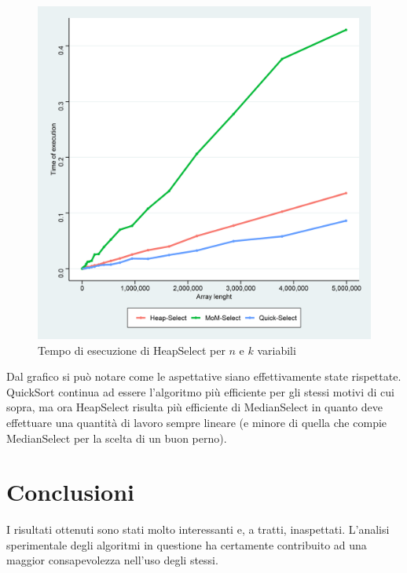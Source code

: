\documentclass{article}
\begin{document}
	\begin{figure}[h!]
  		\includegraphics[width=\linewidth]{images/Grafico_Con_K1.png}
  		\caption{Tempo di esecuzione di HeapSelect per $n$ e $k$ variabili}
  		\label{fig:graph6}
	\end{figure}
	
	Dal grafico si può notare come le aspettative siano effettivamente state rispettate. QuickSort continua ad essere l'algoritmo più efficiente per gli stessi motivi di cui sopra, ma ora HeapSelect risulta più efficiente di MedianSelect in quanto deve effettuare una quantità di lavoro sempre lineare (e minore di quella che compie MedianSelect per la scelta di un buon perno).
	
	
	\newpage

	\section{Conclusioni}
	I risultati ottenuti sono stati molto interessanti e, a tratti, inaspettati. L'analisi sperimentale degli algoritmi in questione ha certamente contribuito ad una maggior consapevolezza nell'uso degli stessi.
\end{document}

